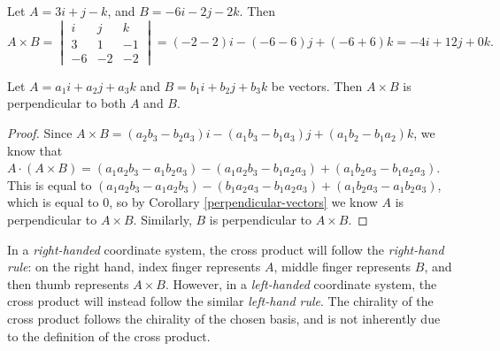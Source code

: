 \documentclass[12pt]{article}
\begin{document}
\begin{exmp}
    Let $A = 3i + j - k$, and $B = -6i - 2j - 2k$. Then \[A \times B =
    \begin{vmatrix}
        i & j & k \\ 3 & 1 & -1 \\ -6 & -2 & -2
    \end{vmatrix} = (-2 - 2)i - (-6 - 6)j + (-6 + 6)k = -4i + 12j + 0k.\]
\end{exmp}

\begin{thm}
    Let $A = a_1i + a_2j + a_3k$ and $B = b_1i + b_2j + b_3k$ be vectors. Then $A \times B$ is perpendicular to both $A$ and $B$.
\end{thm}

\begin{proof}
    Since $A \times B = (a_2b_3 - b_2a_3)i - (a_1b_3 - b_1a_3)j + (a_1b_2 - b_1a_2)k$, we know that $A \cdot (A \times B) = (a_1a_2b_3 - a_1b_2a_3) - (a_1a_2b_3 - b_1a_2a_3) + (a_1b_2a_3 - b_1a_2a_3)$. This is equal to $(a_1a_2b_3 - a_1a_2b_3) - (b_1a_2a_3 - b_1a_2a_3) + (a_1b_2a_3 - a_1b_2a_3)$, which is equal to $0$, so by Corollary \ref{perpendicular-vectors} we know $A$ is perpendicular to $A \times B$. Similarly, $B$ is perpendicular to $A \times B$.
\end{proof}

\begin{rmk}
    In a \emph{right-handed} coordinate system, the cross product will follow the \emph{right-hand rule}: on the right hand, index finger represents $A$, middle finger represents $B$, and then thumb represents $A \times B$. However, in a \emph{left-handed} coordinate system, the cross product will instead follow the similar \emph{left-hand rule}. The chirality of the cross product follows the chirality of the chosen basis, and is not inherently due to the definition of the cross product.
\end{rmk}
\end{document}
